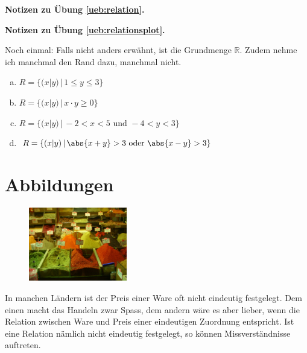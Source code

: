 \documentclass[%
11pt,%
twoside,%
titlepage,%
german,%
headsepline%
]{scrartcl}
\newcommand{\concatueb}[1]{ueb:#1}%
\newcommand{\concatlsg}[1]{lsg:#1}%
\newenvironment{lsg}[1]{%
    \par\noindent\textbf{Notizen zu Übung \ref{\concatueb{#1}}.}%
    \label{\concatlsg{#1}}
}{%
    \par%
}
\begin{document}
\begin{lsg}{relation}
\begin{enumerate}[a)]
\begin{center}
        \end{center}
    \end{enumerate}
\end{lsg}

\begin{lsg}{relationsplot}
Noch einmal: Falls nicht anders erwähnt, ist die Grundmenge $\mathbb{R}$. Zudem nehme ich manchmal den Rand dazu, manchmal nicht.
    \begin{enumerate}[a)]
        \item $R=\{(x|y)\,|\,1\leq y\leq3\}$
        \item $R=\{(x|y)\,|\,x\cdot y\geq0\}$
        \item $R=\{(x|y)\,|\,-2<x<5\text{ und }-4<y<3\}$
        \item $R=\{(x|y)\,|\,\abs{x+y}>3\text{ oder }\abs{x-y}>3\}$
    \end{enumerate}
\end{lsg}

\clearpage

\section{Abbildungen}
\begin{figure}
  \begin{center}
    \includegraphics[width=0.382\textwidth]{pictures/gewuerze}
  \end{center}
\end{figure}
In manchen L\"andern ist der Preis einer Ware oft nicht eindeutig festgelegt. Dem einen macht das Handeln zwar Spass, dem andern w\"are es aber lieber, wenn die Relation zwischen Ware und Preis einer eindeutigen Zuordnung entspricht. Ist eine Relation n\"amlich nicht eindeutig festgelegt, so k\"onnen Missverst\"andnisse auftreten.
\end{document}
